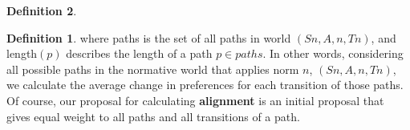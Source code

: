 \documentclass{article}
\theoremstyle{definition}
\newtheorem{definition}{Definition}
\theoremstyle{remark}
\begin{document}
\begin{definition}
\begin{definition}
where paths is the set of all paths in world $(S{n}, A, {n}, T{n})$, and length$(p)$
describes the length of a path $p \in paths$.
In other words, considering all possible paths in the normative world that applies
norm $n$, $(S{n}, A, {n}, T{n})$, we calculate the average change in preferences for
each transition of those paths. Of course, our proposal for calculating \textbf{alignment} is an initial proposal that gives equal weight to all paths and all transitions of a
path.
\end{definition}
 \end{definition}



\end{document}
